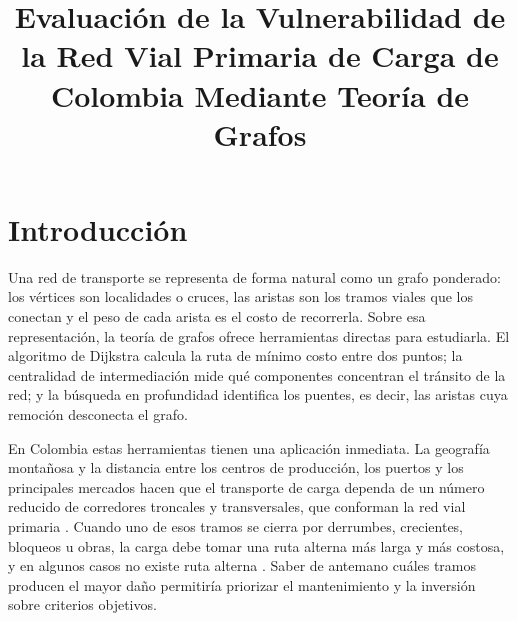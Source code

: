 \documentclass[conference]{IEEEtran}
\begin{document}
\title{Evaluación de la Vulnerabilidad de la Red Vial Primaria de Carga de Colombia Mediante Teoría de Grafos}

\author{
}

\maketitle


\section{Introducción}
Una red de transporte se representa de forma natural como un
grafo ponderado: los vértices son localidades o cruces, las aristas son los
tramos viales que los conectan y el peso de cada arista es el costo de
recorrerla. Sobre esa representación, la teoría de grafos ofrece herramientas
directas para estudiarla. El algoritmo de Dijkstra \cite{dijkstra1959} calcula
la ruta de mínimo costo entre dos puntos; la centralidad de intermediación
\cite{brandes2001} mide qué componentes concentran el tránsito de la red; y la
búsqueda en profundidad \cite{tarjan1972} identifica los puentes, es decir, las
aristas cuya remoción desconecta el grafo.

En Colombia estas herramientas tienen una aplicación inmediata. La geografía
montañosa y la distancia entre los centros de producción, los puertos y los
principales mercados hacen que el transporte de carga dependa de un número
reducido de corredores troncales y transversales, que conforman la red vial
primaria \cite{ocha_hdx_roads}. Cuando uno de esos tramos se cierra por
derrumbes, crecientes, bloqueos u obras, la carga debe tomar una ruta alterna
más larga y más costosa, y en algunos casos no existe ruta alterna
\cite{cambio_radiografia}. Saber de antemano cuáles tramos producen el mayor
daño permitiría priorizar el mantenimiento y la inversión sobre criterios
objetivos.
\end{document}
